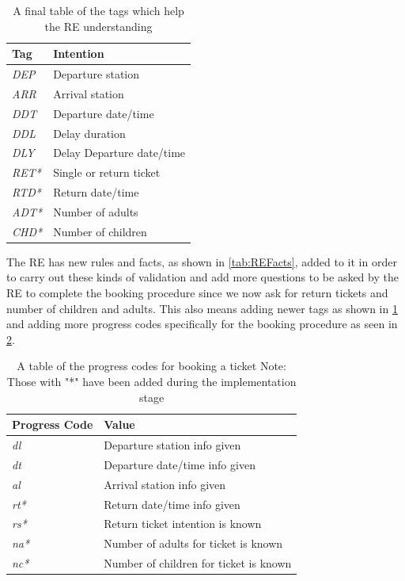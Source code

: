 \documentclass[11pt]{article}
\begin{document}
        \begin{table}[!ht]
\centering
\begin{tabular}{|l|l|}
\hline
\textbf{Tag}  & \textbf{Intention}        \\ \hline
\textit{DEP}  & Departure station         \\ \hline
\textit{ARR}  & Arrival station           \\ \hline
\textit{DDT}  & Departure date/time       \\ \hline
\textit{DDL}  & Delay duration            \\ \hline
\textit{DLY}  & Delay Departure date/time \\ \hline
\textit{RET*} & Single or return ticket   \\ \hline
\textit{RTD*} & Return date/time          \\ \hline
\textit{ADT*} & Number of adults          \\ \hline
\textit{CHD*} & Number of children        \\ \hline
\end{tabular}
\caption{A final table of the tags which help the RE understanding}
\label{tab:FinalTagsRE}
\end{table}
    
    The RE has new rules and facts, as shown in \cref{tab:REFacts}, added to it in order to carry out these kinds of validation and add more questions to be asked by the RE to complete the booking procedure since we now ask for return tickets and number of children and adults. This also means adding newer tags as shown in \cref{tab:FinalTagsRE} and adding more progress codes specifically for the booking procedure as seen in \cref{tab:ProgCodeBook}.
    
    

    
    \begin{table}[!ht]
\centering
\begin{tabular}{|l|l|}
\hline
\textbf{Progress Code} & \textbf{Value}                         \\ \hline
\textit{dl}            & Departure station info given           \\ \hline
\textit{dt}            & Departure date/time info given         \\ \hline
\textit{al}            & Arrival station info given             \\ \hline
\textit{rt*}           & Return date/time info given            \\ \hline
\textit{rs*}           & Return ticket intention is known       \\ \hline
\textit{na*}           & Number of adults for ticket is known   \\ \hline
\textit{nc*}           & Number of children for ticket is known \\ \hline
\end{tabular}
\caption{A table of the progress codes for booking a ticket
Note: Those with "*" have been added during the implementation stage}
\label{tab:ProgCodeBook}
\end{table}
\end{document}
